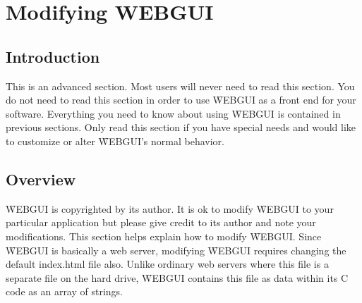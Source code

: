 \cleardoublepage
\setcounter{chapter}{6} %
\setcounter{section}{7} %
\chapter{Modifying WEBGUI}
\setcounter{page}{59} %

\section{Introduction}
\label{sec:6-1}
This is an advanced section. Most users will never need to read this section. You do not need to read this 
section in order to use \f{WEBGUI} as a front end for your software. Everything you need to know about using
\f{WEBGUI} is contained in previous sections. Only read this section if you have special needs and would like
to customize or alter \f{WEBGUI}'s normal behavior.

\section{Overview}
\f{WEBGUI} is copyrighted by its author. It is ok to modify \f{WEBGUI} to your particular application
but please give credit to its author and note your modifications. This section helps explain how to modify \f{WEBGUI}. 
Since \f{WEBGUI} is basically a web server, modifying \f{WEBGUI} requires changing the default index.html file also.
Unlike ordinary web servers where this file is a separate file on the hard drive, \f{WEBGUI} contains
this file as data within its C code as an array of strings.

